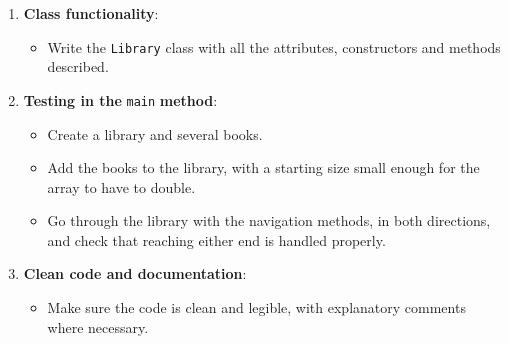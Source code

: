 \begin{enumerate}

    \item \textbf{Class functionality}:

        \begin{itemize}

            \item Write the \texttt{Library} class with all the attributes, constructors and methods described.

        \end{itemize}

    \item \textbf{Testing in the} \texttt{main} \textbf{method}:

        \begin{itemize}

            \item Create a library and several books.

            \item Add the books to the library, with a starting size small enough for the array to have to double.

            \item Go through the library with the navigation methods, in both directions, and check that reaching either end is handled properly.

        \end{itemize}

    \item \textbf{Clean code and documentation}:

        \begin{itemize}

            \item Make sure the code is clean and legible, with explanatory comments where necessary.

        \end{itemize}

\end{enumerate}
